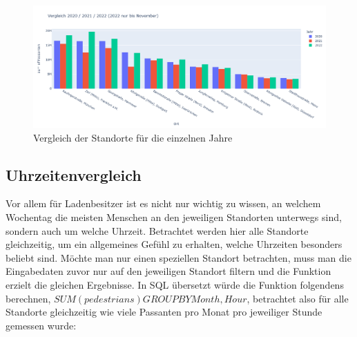 \begin{figure}[h!]
    \vspace{0.2cm}
    \centering
    \includegraphics[width=\linewidth]{images/absJahresvergleich.png}
    \caption{Vergleich der Standorte für die einzelnen Jahre}
    \label{fig:absJahresvergleich}
\end{figure}

\subsection{Uhrzeitenvergleich}
Vor allem für Ladenbesitzer ist es nicht nur wichtig zu wissen, an welchem Wochentag die meisten Menschen an den jeweiligen Standorten unterwegs sind, sondern auch um welche Uhrzeit. 
Betrachtet werden hier alle Standorte gleichzeitig, um ein allgemeines Gefühl zu erhalten, welche Uhrzeiten besonders beliebt sind. Möchte man nur einen speziellen Standort betrachten, muss man die Eingabedaten zuvor nur auf den jeweiligen Standort filtern und die Funktion erzielt die gleichen Ergebnisse. In SQL übersetzt würde die Funktion folgendens berechnen, $ SUM(pedestrians) GROUP BY Month, Hour $, betrachtet also für alle Standorte gleichzeitig wie viele Passanten pro Monat pro jeweiliger Stunde gemessen wurde:

